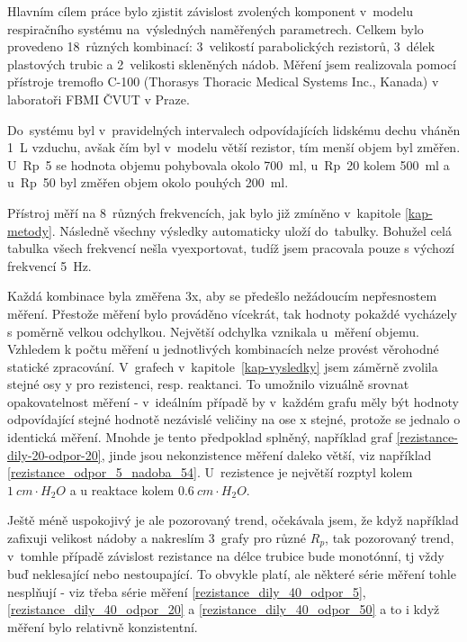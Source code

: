 
Hlavním cílem práce bylo zjistit závislost zvolených komponent v~modelu respiračního systému na~výsledných naměřených parametrech.  Celkem bylo provedeno 18~různých kombinací: 3~velikostí parabolických rezistorů, 3~délek plastových trubic a 2~velikosti skleněných nádob. Měření jsem realizovala pomocí přístroje tremoflo C-100 (Thorasys Thoracic Medical Systems Inc., Kanada) v laboratoři FBMI ČVUT v Praze. 


Do~systému byl v~pravidelných intervalech odpovídajících lidskému dechu vháněn \SI{1}{L} vzduchu, avšak čím byl v~modelu větší rezistor, tím menší objem byl změřen. U~Rp~5 se hodnota objemu pohybovala okolo  \SI{700}{ml}, u~Rp~20 kolem  \SI{500}{ml} a u~Rp~50 byl změřen objem okolo pouhých \SI{200}{ml}.

Přístroj měří na 8~různých frekvencích, jak bylo již zmíněno v~kapitole \ref{kap-metody}. Následně všechny výsledky automaticky uloží do~tabulky. 
Bohužel celá tabulka všech frekvencí nešla vyexportovat, tudíž jsem pracovala pouze s výchozí frekvencí  \SI{5}{Hz}. 

Každá kombinace byla změřena 3x, aby se předešlo nežádoucím nepřesnostem měření. Přestože měření bylo prováděno vícekrát, tak hodnoty pokaždé vycházely s poměrně velkou odchylkou. Největší odchylka vznikala u~měření objemu.  Vzhledem k počtu měření u jednotlivých kombinacích nelze provést věrohodné statické zpracování.
V~grafech v~kapitole~\ref{kap-vysledky} jsem záměrně zvolila stejné osy y pro rezistenci, resp. reaktanci. To umožnilo vizuálně srovnat opakovatelnost měření -  v~ideálním případě by v~každém grafu měly být hodnoty odpovídající stejné hodnotě nezávislé veličiny na ose x stejné, protože se jednalo o identická měření. Mnohde je tento předpoklad splněný, například graf \ref{rezistance-dily-20-odpor-20}, jinde jsou nekonzistence měření daleko větší, viz například \ref{rezistance_odpor_5_nadoba_54}.
U~rezistence je největší rozptyl kolem $\SI{1}{ cm\cdot H_{2}O}$ a u reaktace kolem $\SI{0,6}{ cm\cdot H_{2}O}$. 


Ještě méně uspokojivý je ale pozorovaný trend, očekávala jsem, že když například zafixuji velikost nádoby a nakreslím 3~grafy pro různé $R_p$, tak pozorovaný trend, v~tomhle případě závislost rezistance na délce trubice bude monotónní, tj vždy buď neklesající nebo nestoupající. To obvykle platí, ale některé série měření tohle nesplňují - viz třeba série měření
\ref{rezistance_dily_40_odpor_5}, \ref{rezistance_dily_40_odpor_20} a \ref{rezistance_dily_40_odpor_50} a to i když měření bylo relativně konzistentní.


